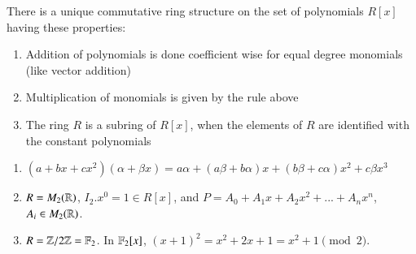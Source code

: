 \documentclass[12pt, a4paper, twoside, openright, titlepage]{book}
\begin{document}
\begin{prop}{}{}
    There is a unique commutative ring structure on the set of polynomials $R[x]$ having these properties:\begin{enumerate}
        \item Addition of polynomials is done coefficient wise for equal degree monomials (like vector addition)
        \item Multiplication of monomials is given by the rule above
        \item The ring $R$ is a subring of $R[x]$, when the elements of $R$ are identified with the constant polynomials
    \end{enumerate}
\end{prop}

\begin{rmk}{}{}
    \leavevmode
    \begin{enumerate}
        \item $(a+bx+cx^2)(\alpha+\beta x) = a\alpha + (a\beta + b\alpha)x + (b\beta + c\alpha)x^2 + c\beta x^3$
        \item $R = M_2(\mathbb R)$, $I_2.x^0 = 1 \in R[x]$, and $P = A_0 + A_1x + A_2x^2 + ... + A_nx^n$, $A_i \in M_2(\mathbb R)$.
        \item $R = \mathbb Z/2\mathbb Z = \mathbb F_2$. In $\mathbb F_2[x]$, $(x+1)^2 = x^2+2x+1 = x^2+1 \pmod{2}$.
    \end{enumerate}
\end{rmk}
\end{document}
